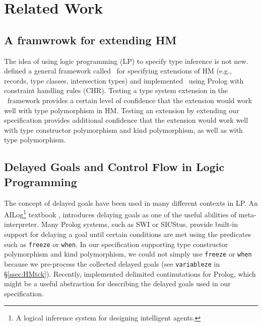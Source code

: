 \section{Related Work}\label{sec:relwork}
\subsection{A framwrowk for extending HM}
The idea of using logic programming (LP) to specify type inference is not new.
\citet*{HMX99} defined a general framework called \HMX\ for specifying
extensions of HM (e.g., records, type classes, intersection types)
and \citet{tyinferCHR02} implemented \HMX\ using Prolog with
constraint handling rules (CHR). Testing a type system extension
in the \HMX\ framework provides a certain level of confidence that the extension
would work well with type polymorphism in HM. Testing an extension by
extending our specification provides additional confidence that the extension
would work well with type constructor polymorphism and kind polymorphism,
as well as with type polymorphism.

\subsection{Delayed Goals and Control Flow in Logic Programming}
The concept of delayed goals have been used in many different contexts
in LP. An AILog\footnote{A logical inference system for designing
	 intelligent agents.} textbook \cite{AILogTextBook},
introduces delaying goals as one of the useful abilities of meta-interpreter.
Many Prolog systems, such as SWI or SICStus, provide built-in support for
delaying a goal until certain conditions are met using the predicates
such as \verb|freeze| or \verb|when|. In our specification supporting
type constructor polymorphism and kind polymorphism, we could not
simply use \verb|freeze| or \verb|when| because we pre-process
the collected delayed goals (see \verb|variableze| in \S\ref{ssec:HMtck}).
Recently, \citet{SchDemDesWei13} implemented delimited continutations for
Prolog, which might be a useful abstraction for describing the delayed goals
used in our specification.

